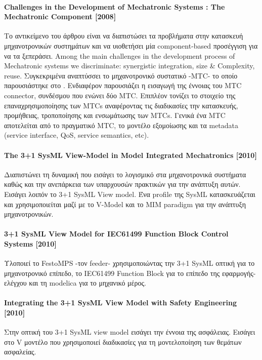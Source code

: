 \documentclass[a4paper,12pt,twoside]{report}
\begin{document}
{				\paragraph{Challenges in the Development of Mechatronic
Systems : The Mechatronic Component [2008]}{Το αντικείμενο του άρθρου είναι να διαπιστώσει τα προβλήματα στην κατασκευή μηχανοτρονικών συστημάτων και να υιοθετήσει μία component-based προσέγγιση για να τα ξεπεράσει. Among the main challenges in the development process of Mechatronic systems we discriminate: synergistic integration, size \& Complexity, reuse. Συγκεκριμένα αναπτύσσει το μηχανοτρονικό συστατικό -MTC- το οποίο παρουσιάστηκε στο \cite{ModelIntegratedMechatronics:Thramboulidis2005}. Ενδιαφέρον παρουσιάζει η εισαγωγή της έννοιας του MTC connector, συνδέσμου που ενώνει δύο MTC. \linebreak Επιπλέον τονίζει το στοιχείο της επαναχρησιμοποίησης των MTCs αναφέροντας τις διαδικασίες την κατασκευής, προμήθειας, τροποποίησης και ενσωμάτωσης των MTCs. Γενικά ένα MTC αποτελείται από το πραγματικό MTC, το μοντέλο εξομοίωσης και τα metadata (service interface, QoS, service semantics,
etc).  \cite{TheMechatronicComponent:Thramboulidis2008}
				}
				
				\paragraph{The 3+1 SysML View-Model in Model Integrated Mechatronics [2010]}{Διαπιστώνει τη δυναμική που εισάγει το λογισμικό στα μηχανοτρονικά συστήματα καθώς και την ανεπάρκεια των υπαρχουσών πρακτικών για την ανάπτυξη αυτών. Εισάγει λοιπόν το 3+1 SysML View model. Ένα profile της SysML κατασκευάζεται και χρησιμοποιείται μαζί με το V-Model και το MIM paradigm για την ανάπτυξη μηχανοτρονικών. \cite{The3+1SysmlView-ModelInMIM:Thramboulidis2010}
				}
				
				\paragraph{3+1 SysML View Model for IEC61499 Function
Block Control Systems [2010]}{ Υλοποιεί το FestoMPS -τον feeder- χρησιμοποιώντας την 3+1 SysML οπτική για το μηχανοτρονικό επίπεδο, το IEC61499 Function Block για το επίπεδο της εφαρμογής-ελέγχου και τη modelica για το μηχανικό μέρος. \cite{3+1SysmlViewModelForIEC61499FBContolSystems:Thramboulidis2010}
				}
				
				\paragraph{Integrating the 3+1 SysML View Model
with Safety Engineering [2010]}{Στην οπτική του 3+1 SysML view model εισάγει την έννοια της ασφάλειας. Εισάγει στο V μοντέλο που χρησιμοποιεί διαδικασίες για τη μοντελοποίηση των θεμάτων ασφαλείας. \cite{IntegratingThe3+1SysnlViewModelWithSafetyEngineering:Thramboulidis2010}
				}
				
}
\end{document}
